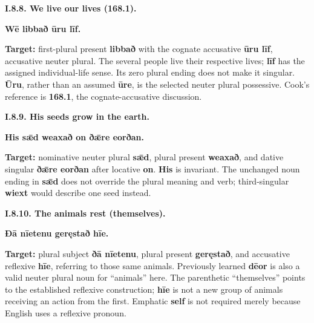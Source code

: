 \par\begin{minipage}{\linewidth}\raggedright
\textbf{I.8.8. We live our lives (168.1).}

\textbf{Wē libbað ūru līf.}

\textbf{Target:} first-plural present \textbf{libbað} with the cognate accusative \textbf{ūru līf}, accusative neuter plural. The several people live their respective lives; \textbf{līf} has the assigned individual-life sense. Its zero plural ending does not make it singular. \textbf{Ūru}, rather than an assumed \textbf{ūre}, is the selected neuter plural possessive. Cook's reference is \textbf{168.1}, the cognate-accusative discussion.

\end{minipage}\par\addvspace{4pt}

\par\begin{minipage}{\linewidth}\raggedright
\textbf{I.8.9. His seeds grow in the earth.}

\textbf{His sǣd weaxað on ðǣre eorðan.}

\textbf{Target:} nominative neuter plural \textbf{sǣd}, plural present \textbf{weaxað}, and dative singular \textbf{ðǣre eorðan} after locative \textbf{on}. \textbf{His} is invariant. The unchanged noun ending in \textbf{sǣd} does not override the plural meaning and verb; third-singular \textbf{wiext} would describe one seed instead.

\end{minipage}\par\addvspace{4pt}

\par\begin{minipage}{\linewidth}\raggedright
\textbf{I.8.10. The animals rest (themselves).}

\textbf{Ðā nīetenu geręstað hīe.}

\textbf{Target:} plural subject \textbf{ðā nīetenu}, plural present \textbf{geręstað}, and accusative reflexive \textbf{hīe}, referring to those same animals. Previously learned \textbf{dēor} is also a valid neuter plural noun for “animals” here. The parenthetic “themselves” points to the established reflexive construction; \textbf{hīe} is not a new group of animals receiving an action from the first. Emphatic \textbf{self} is not required merely because English uses a reflexive pronoun.

\end{minipage}\par\addvspace{4pt}

